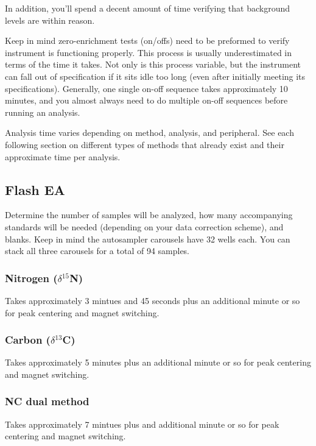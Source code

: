 \documentclass[12pt]{../SOP3_beta}\usepackage[]{graphicx}\usepackage[]{color}
\begin{document}
\NP In addition, you'll spend a decent amount of time verifying that background levels are within reason. 

\NP Keep in mind zero-enrichment tests (on/offs) need to be preformed to verify instrument is functioning properly. This process is usually underestimated in terms of the time it takes. Not only is this process variable, but the instrument can fall out of specification if it sits idle too long (even after initially meeting its specifications). Generally, one single on-off sequence takes approximately 10 minutes, and you almost always need to do multiple on-off sequences before running an analysis.

\NP Analysis time varies depending on method, analysis, and peripheral. See each following section on different types of methods that already exist and their approximate time per analysis.

\subsection{Flash EA}

\NP Determine the number of samples will be analyzed, how many accompanying standards will be needed (depending on your data correction scheme), and blanks. Keep in mind the autosampler carousels have 32 wells each. You can stack all three carousels for a total of 94 samples.

\subsubsection{Nitrogen ($\delta$$^{15}$N)}

\NP Takes approximately 3 mintues and 45 seconds plus an additional minute or so for peak centering and magnet switching.

\subsubsection{Carbon ($\delta$$^{13}$C)}

\NP Takes approximately 5 minutes plus an additional minute or so for peak centering and magnet switching.

\subsubsection{NC dual method}

\NP Takes approximately 7 mintues plus and additional minute or so for peak centering and magnet switching.
\end{document}

